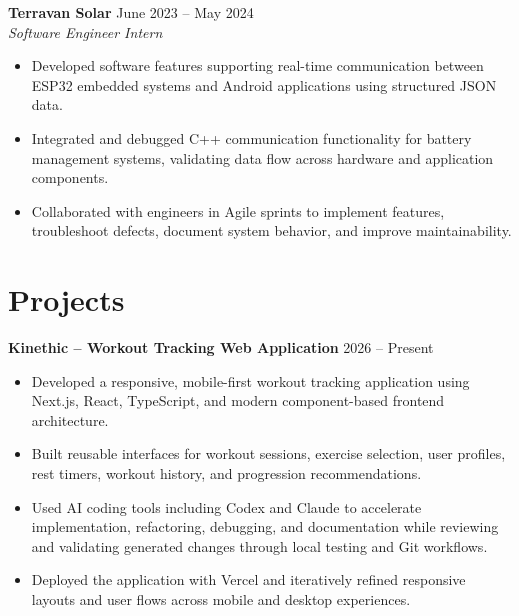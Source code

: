 \documentclass[a4paper,10pt]{article}
\newcommand{\dateright}[1]{%
  \hfill{\small\textnormal{#1}}%
}
\begin{document}
\textbf{Terravan Solar}
\dateright{June 2023 -- May 2024}\\[-1pt]
\textit{Software Engineer Intern}

\begin{itemize}
  \item Developed software features supporting real-time communication between ESP32 embedded systems and Android applications using structured JSON data.
  
  \item Integrated and debugged C++ communication functionality for battery management systems, validating data flow across hardware and application components.
  
  \item Collaborated with engineers in Agile sprints to implement features, troubleshoot defects, document system behavior, and improve maintainability.
\end{itemize}

\section*{Projects}

\textbf{Kinethic -- Workout Tracking Web Application}
\dateright{2026 -- Present}

\begin{itemize}
  \item Developed a responsive, mobile-first workout tracking application using Next.js, React, TypeScript, and modern component-based frontend architecture.
  
  \item Built reusable interfaces for workout sessions, exercise selection, user profiles, rest timers, workout history, and progression recommendations.
  
  \item Used AI coding tools including Codex and Claude to accelerate implementation, refactoring, debugging, and documentation while reviewing and validating generated changes through local testing and Git workflows.
  
  \item Deployed the application with Vercel and iteratively refined responsive layouts and user flows across mobile and desktop experiences.
\end{itemize}

\vspace{2pt}
\end{document}
